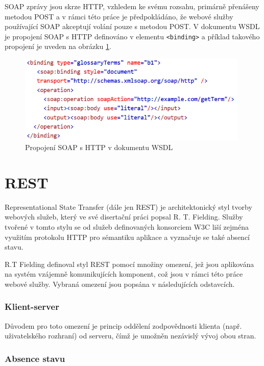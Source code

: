 \documentclass[czech,DP]{thesiskiv}
\begin{document}
SOAP zprávy jsou skrze HTTP, vzhledem ke svému rozsahu, primárně přenášeny metodou POST a v rámci této práce je předpokládáno, že webové služby používající SOAP akceptují volání pouze s metodou POST. V dokumentu WSDL je propojení SOAP s HTTP definováno v elementu \verb|<binding>| a příklad takového propojení je uveden na obrázku \ref{fig:soap-http-binding}.

\begin{figure}[h]
	\centering
	\includegraphics[width=11cm]{soap-http-binding}
	\caption{Propojení SOAP s HTTP v dokumentu WSDL}
	\label{fig:soap-http-binding}
\end{figure}


\section{REST}
\label{sec:rest}

%

Representational State Transfer (dále jen REST) je architektonický styl tvorby webových služeb, který ve své disertační práci  \cite{fielding2000rest} popsal R. T. Fielding. Služby tvořené v tomto stylu se od služeb definovaných konsorciem W3C liší zejména využitím protokolu HTTP pro sémantiku aplikace a vyznačuje se také absencí stavu. 

R.T Fielding definoval styl REST pomocí množiny omezení, jež jsou aplikována na systém vzájemně komunikujících komponent, což jsou v rámci této práce webové služby. Vybraná omezení jsou popsána v následujících odstavcích.

\subsubsection{Klient-server}
Důvodem pro toto omezení je princip oddělení zodpovědnosti klienta (např. uživatelského rozhraní) od serveru, čímž je umožněn nezávislý vývoj  obou stran.

\subsubsection{Absence stavu}
\end{document}
